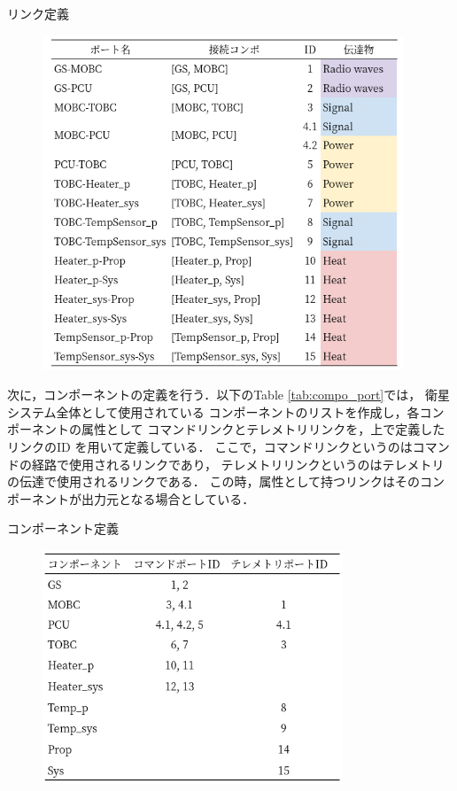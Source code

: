 \documentclass[11pt]{article}
\begin{document}
\newpage
\begin{table}[H]
   \centering
   \caption{リンク定義} 
   \label{tab:port_definition}
\end{table} 
\vspace{-2zh}
\begin{figure}[H]
   \centering
      \includegraphics[height=10cm]{figure/port_definition.png}
\end{figure}
次に，コンポーネントの定義を行う．以下のTable \ref{tab:compo_port}では，
衛星システム全体として使用されている
コンポーネントのリストを作成し，各コンポーネントの属性として
コマンドリンクとテレメトリリンクを，上で定義したリンクのID
を用いて定義している．
ここで，コマンドリンクというのはコマンドの経路で使用されるリンクであり，
テレメトリリンクというのはテレメトリの伝達で使用されるリンクである．
この時，属性として持つリンクはそのコンポーネントが出力元となる場合としている．

\begin{table}[H]
   \centering
   \caption{コンポーネント定義} 
   \label{tab:compo_port}
\end{table}
\vspace{-2zh}
\begin{figure}[H]
   \centering
      \includegraphics[height=7cm]{figure/compo_port.png}
\end{figure}
\end{document}
